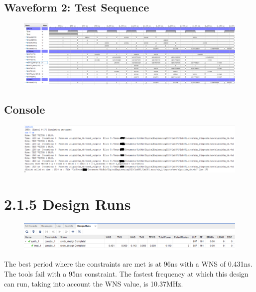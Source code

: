 \documentclass[11pt]{report}
\begin{document}
\subsection*{Waveform 2: Test Sequence}
\begin{figure}[H]
    \includegraphics[width=\columnwidth]{Reports/Lab3/Assets/2.1.4_waveform-test-sequence.png}
\end{figure}

\subsection*{Console}
\begin{figure}[H]
    \includegraphics[width=\columnwidth]{Reports/Lab3/Assets/2.1.4_console.png}
\end{figure}

\section*{2.1.5 Design Runs}
\begin{figure}[H]
    \includegraphics[width=\columnwidth]{Reports/Lab3/Assets/2.1.5_design-runs.png}
\end{figure}
The best period where the constraints are met is at 96ns with a WNS of 0.431ns. The tools fail with a 95ns constraint. The fastest frequency at which this design can run, taking into account the WNS value, is 10.37MHz.
\end{document}
